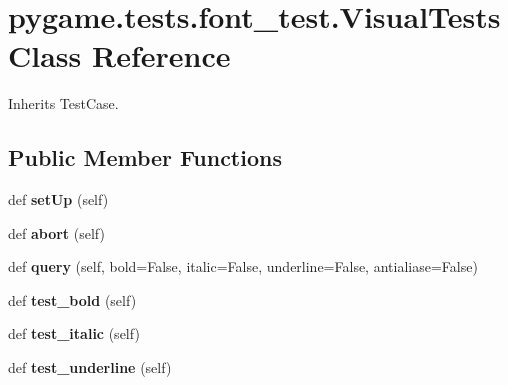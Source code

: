 \hypertarget{classpygame_1_1tests_1_1font__test_1_1_visual_tests}{}\section{pygame.\+tests.\+font\+\_\+test.\+Visual\+Tests Class Reference}
\label{classpygame_1_1tests_1_1font__test_1_1_visual_tests}


Inherits Test\+Case.

\subsection*{Public Member Functions}
\begin{DoxyCompactItemize}
\item 
\mbox{\label{classpygame_1_1tests_1_1font__test_1_1_visual_tests_a570ca53cb6079002aceefda6080af09b}} 
def {\bfseries set\+Up} (self)
\item 
\mbox{\label{classpygame_1_1tests_1_1font__test_1_1_visual_tests_ab9ba5316a4e3632fa5d766588b56bba6}} 
def {\bfseries abort} (self)
\item 
\mbox{\label{classpygame_1_1tests_1_1font__test_1_1_visual_tests_aaaf2736da12785f0c49441fd15bb2b0d}} 
def {\bfseries query} (self, bold=False, italic=False, underline=False, antialiase=False)
\item 
\mbox{\label{classpygame_1_1tests_1_1font__test_1_1_visual_tests_aaa98ba50a2736533eec371fc07cd9c3e}} 
def {\bfseries test\+\_\+bold} (self)
\item 
\mbox{\label{classpygame_1_1tests_1_1font__test_1_1_visual_tests_a105b1929198662112f86f5e5dae86706}} 
def {\bfseries test\+\_\+italic} (self)
\item 
\mbox{\label{classpygame_1_1tests_1_1font__test_1_1_visual_tests_aa497319e05f862264c1d913f36bed507}} 
def {\bfseries test\+\_\+underline} (self)
\item 

\end{DoxyCompactItemize}
